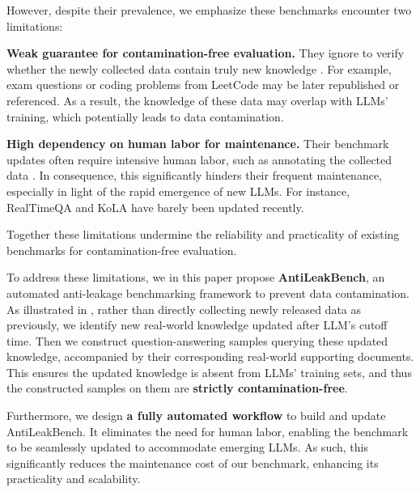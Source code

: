 \documentclass[11pt]{article}
\newcommand{\benchname}{{AntiLeakBench}\xspace}
\begin{document}



    However, despite their prevalence,
    we emphasize these benchmarks encounter two limitations:
    \begin{inparaenum}
        \item
            \textbf{Weak guarantee for contamination-free evaluation.}
            They ignore to verify whether the newly collected data contain truly new knowledge \cite{roberts2023cutoff,white2024livebench,jain2024livecodebench}.
            For example, exam questions or coding problems from LeetCode may be later republished or referenced.
            As a result, the knowledge of these data may overlap with LLMs' training,
            which potentially leads to data contamination.
        \item
            \textbf{High dependency on human labor for maintenance.}
            Their benchmark updates often require intensive human labor, such as annotating the collected data \cite{gu2024xiezhi,xu2024let}.
            In consequence, this significantly hinders their frequent maintenance,
            especially in light of the rapid emergence of new LLMs.
            For instance, RealTimeQA \cite{kasai2023realtime} and KoLA \cite{yu2023kola} have barely been updated recently.
    \end{inparaenum}
    Together these limitations undermine the reliability and practicality of existing benchmarks for contamination-free evaluation.

    To address these limitations, we in this paper propose \textbf{\benchname}, an automated anti-leakage benchmarking framework to prevent data contamination.
    As illustrated in ,
    rather than directly collecting newly released data as previously,
    we identify new real-world knowledge updated after LLM's cutoff time.
    Then we construct question-answering samples querying these updated knowledge,
    accompanied by their corresponding real-world supporting documents.
    This ensures the updated knowledge is absent from LLMs' training sets,
    and thus the constructed samples on them are \textbf{strictly contamination-free}.

    Furthermore, we design \textbf{a fully automated workflow} to build and update \benchname.
    It eliminates the need for human labor, enabling the benchmark to be seamlessly updated to accommodate emerging LLMs.
    As such, this significantly reduces the maintenance cost of our benchmark, enhancing its practicality and scalability.
\end{document}
